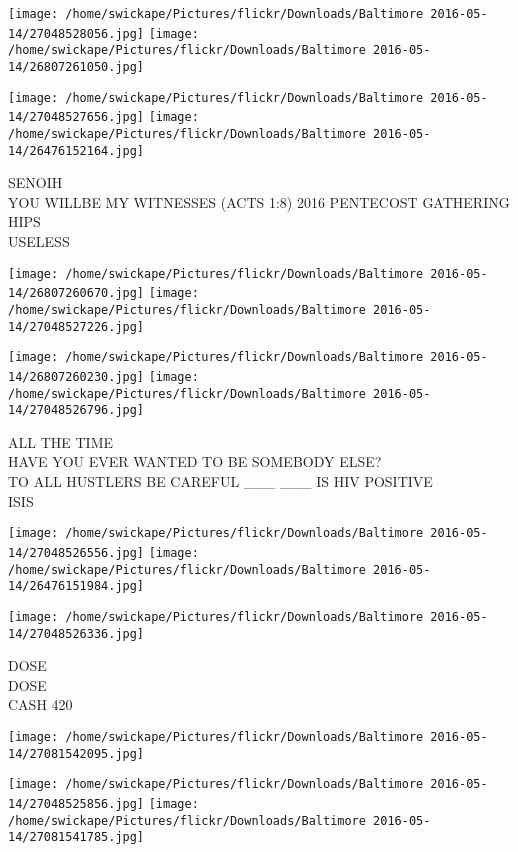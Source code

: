 \documentclass[10pt,letterpaper]{article}
\begin{document}
\texttt{[image: /home/swickape/Pictures/flickr/Downloads/Baltimore 2016-05-14/27048528056.jpg]}
\texttt{[image: /home/swickape/Pictures/flickr/Downloads/Baltimore 2016-05-14/26807261050.jpg]}

\texttt{[image: /home/swickape/Pictures/flickr/Downloads/Baltimore 2016-05-14/27048527656.jpg]}
\texttt{[image: /home/swickape/Pictures/flickr/Downloads/Baltimore 2016-05-14/26476152164.jpg]}

SENOIH\\
YOU WILLBE MY WITNESSES (ACTS 1:8) 2016 PENTECOST GATHERING\\
HIPS\\
USELESS\\
\pagebreak

\texttt{[image: /home/swickape/Pictures/flickr/Downloads/Baltimore 2016-05-14/26807260670.jpg]}
\texttt{[image: /home/swickape/Pictures/flickr/Downloads/Baltimore 2016-05-14/27048527226.jpg]}

\texttt{[image: /home/swickape/Pictures/flickr/Downloads/Baltimore 2016-05-14/26807260230.jpg]}
\texttt{[image: /home/swickape/Pictures/flickr/Downloads/Baltimore 2016-05-14/27048526796.jpg]}

ALL THE TIME\\
HAVE YOU EVER WANTED TO BE SOMEBODY ELSE?\\
TO ALL HUSTLERS BE CAREFUL \_\_\_ \_\_\_ IS HIV POSITIVE\\
ISIS\\
\pagebreak

\texttt{[image: /home/swickape/Pictures/flickr/Downloads/Baltimore 2016-05-14/27048526556.jpg]}
\texttt{[image: /home/swickape/Pictures/flickr/Downloads/Baltimore 2016-05-14/26476151984.jpg]}

\texttt{[image: /home/swickape/Pictures/flickr/Downloads/Baltimore 2016-05-14/27048526336.jpg]}

DOSE\\
DOSE\\
CASH 420\\
\pagebreak

\texttt{[image: /home/swickape/Pictures/flickr/Downloads/Baltimore 2016-05-14/27081542095.jpg]}

\vspace{0.25in}
\texttt{[image: /home/swickape/Pictures/flickr/Downloads/Baltimore 2016-05-14/27048525856.jpg]}
\texttt{[image: /home/swickape/Pictures/flickr/Downloads/Baltimore 2016-05-14/27081541785.jpg]}
\end{document}

